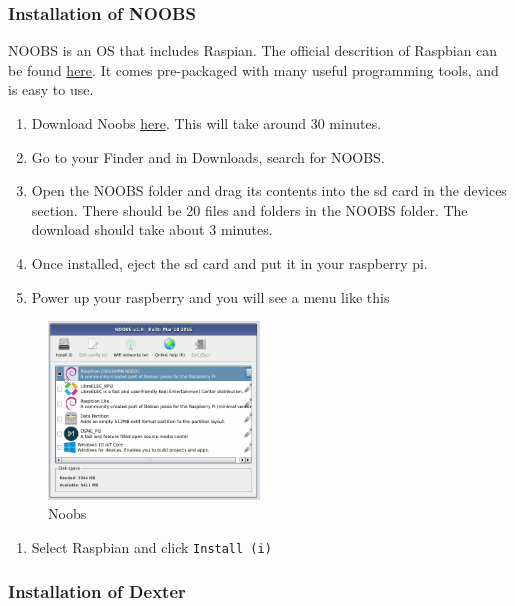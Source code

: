 \subsubsection{Installation of NOOBS}\label{installation-of-noobs}

NOOBS is an OS that includes Raspian. The official descrition of
Raspbian can be found
\href{https://www.raspberrypi.org/downloads/raspbian/}{here}. It comes
pre-packaged with many useful programming tools, and is easy to use.

\begin{enumerate}
\def\labelenumi{\arabic{enumi}.}
\tightlist
\item
  Download Noobs
  \href{https://www.raspberrypi.org/downloads/noobs/}{here}. This will
  take around 30 minutes.
\item
  Go to your Finder and in Downloads, search for NOOBS.
\item
  Open the NOOBS folder and drag its contents into the sd card in the
  devices section. There should be 20 files and folders in the NOOBS
  folder. The download should take about 3 minutes.
\item
  Once installed, eject the sd card and put it in your raspberry pi.
\item
  Power up your raspberry and you will see a menu like this
\end{enumerate}

\begin{figure}
\centering
\includegraphics[width=0.5\textwidth]{images/noobs.jpg}
\caption{Noobs}
\end{figure}

\begin{enumerate}
\def\labelenumi{\arabic{enumi}.}
\setcounter{enumi}{5}
\tightlist
\item
  Select Raspbian and click \texttt{Install\ (i)}
\end{enumerate}

\subsubsection{Installation of Dexter}\label{installation-of-dexter}

